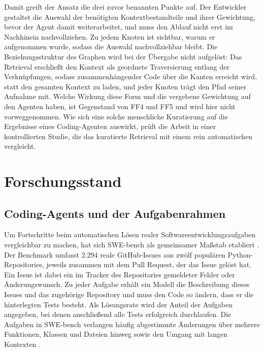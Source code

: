Damit greift der Ansatz die drei zuvor benannten Punkte auf. Der Entwickler gestaltet die Auswahl der benötigten Kontextbestandteile und ihrer Gewichtung, bevor der Agent damit weiterarbeitet, und muss den Ablauf nicht erst im Nachhinein nachvollziehen. Zu jedem Knoten ist sichtbar, warum er aufgenommen wurde, sodass die Auswahl nachvollziehbar bleibt. Die Beziehungsstruktur des Graphen wird bei der Übergabe nicht aufgelöst: Das Retrieval erschließt den Kontext als geordnete Traversierung entlang der Verknüpfungen, sodass zusammenhängender Code über die Kanten erreicht wird, statt den gesamten Kontext zu laden, und jeder Knoten trägt den Pfad seiner Aufnahme mit. Welche Wirkung diese Form und die vergebene Gewichtung auf den Agenten haben, ist Gegenstand von FF4 und FF5 und wird hier nicht vorweggenommen. Wie sich eine solche menschliche Kuratierung auf die Ergebnisse eines Coding-Agenten auswirkt, prüft die Arbeit in einer kontrollierten Studie, die das kuratierte Retrieval mit einem rein automatischen vergleicht.

\section{Forschungsstand}

\subsection{Coding-Agents und der Aufgabenrahmen}

Um Fortschritte beim automatischen Lösen realer Softwareentwicklungsaufgaben vergleichbar zu machen, hat sich SWE-bench als gemeinsamer Maßstab etabliert \parencite{jimenez2024swebench}. Der Benchmark umfasst 2.294 reale GitHub-Issues aus zwölf populären Python-Repositories, jeweils zusammen mit dem Pull Request, der das Issue gelöst hat. Ein Issue ist dabei ein im Tracker des Repositories gemeldeter Fehler oder Änderungswunsch. Zu jeder Aufgabe erhält ein Modell die Beschreibung dieses Issues und das zugehörige Repository und muss den Code so ändern, dass er die hinterlegten Tests besteht. Als Lösungsrate wird der Anteil der Aufgaben angegeben, bei denen anschließend alle Tests erfolgreich durchlaufen. Die Aufgaben in SWE-bench verlangen häufig abgestimmte Änderungen über mehrere Funktionen, Klassen und Dateien hinweg sowie den Umgang mit langen Kontexten \parencite{jimenez2024swebench}.

